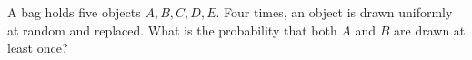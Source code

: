 A bag holds five objects $A,B,C,D,E$. Four times, an object is drawn uniformly at random and replaced. What is the probability that both $A$ and $B$ are drawn at least once?
